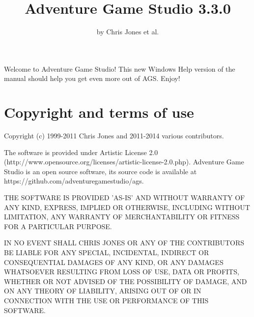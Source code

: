 %
%
\newcommand{\commandref}[2]{\helpref{{\tt $\backslash$#1}}{#2}}%
\newcommand{\commandrefn}[2]{\helprefn{{\tt $\backslash$#1}}{#2}\index{#1}}%
\newcommand{\commandpageref}[2]{\latexignore{\helprefn{{\tt $\backslash$#1}}{#2}}\latexonly{{\tt $\backslash$#1} {\it page \pageref{#2}}}\index{#1}}%
\newcommand{\indexit}[1]{#1\index{#1}}%
\newcommand{\inioption}[1]{{\bf {\tt #1}}\index{#1}}%
\parskip=10pt%
\parindent=0pt%
\title{Adventure Game Studio 3.3.0}%
\author{by Chris Jones et al.}%
\makeindex%
%

\maketitle%
\pagestyle{fancyplain}%
%
%
%
\setfooter{\thepage}{}{}{}{}{\thepage}%

Welcome to Adventure Game Studio! This new Windows Help version of the manual should
help you get even more out of AGS. Enjoy!

\tableofcontents%

\chapter*{Copyright and terms of use}%
%
\setfooter{\thepage}{}{}{}{}{\thepage}%

Copyright (c) 1999-2011 Chris Jones and 2011-2014 various contributors.

The software is provided under Artistic License 2.0
(http://www.opensource.org/licenses/artistic-license-2.0.php).
Adventure Game Studio is an open source software, its source code is available
at https://github.com/adventuregamestudio/ags.

THE SOFTWARE IS PROVIDED 'AS-IS' AND WITHOUT WARRANTY OF ANY KIND, EXPRESS,
IMPLIED OR OTHERWISE, INCLUDING WITHOUT LIMITATION, ANY WARRANTY OF
MERCHANTABILITY OR FITNESS FOR A PARTICULAR PURPOSE.

IN NO EVENT SHALL CHRIS JONES OR ANY OF THE CONTRIBUTORS BE LIABLE FOR ANY
SPECIAL, INCIDENTAL, INDIRECT OR CONSEQUENTIAL DAMAGES OF ANY KIND, OR ANY
DAMAGES WHATSOEVER RESULTING FROM LOSS OF USE, DATA OR PROFITS, WHETHER OR
NOT ADVISED OF THE POSSIBILITY OF DAMAGE, AND ON ANY THEORY OF LIABILITY,
ARISING OUT OF OR IN CONNECTION WITH THE USE OR PERFORMANCE OF THIS SOFTWARE.


